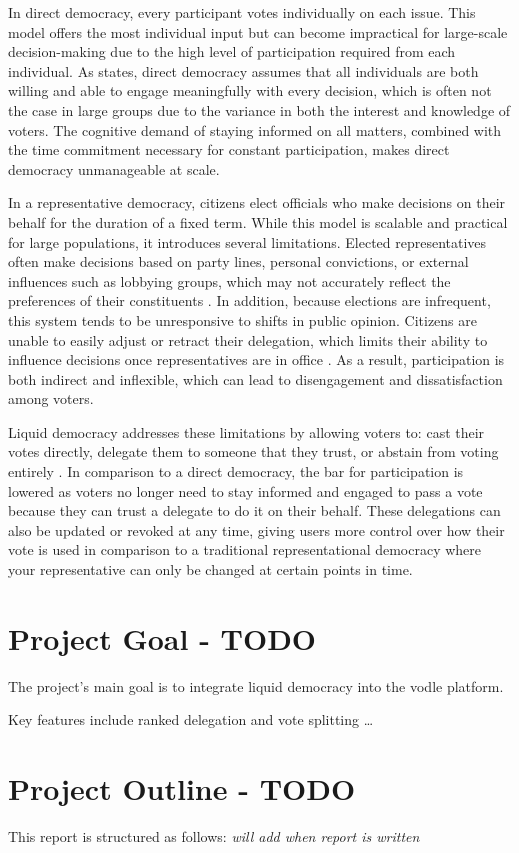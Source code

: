 In direct democracy, every participant votes individually on each issue. This model offers the most individual input but can become impractical for large-scale decision-making due to the high level of participation required from each individual. As \cite{ford_delegative_2002} states, direct democracy assumes that all individuals are both willing and able to engage meaningfully with every decision, which is often not the case in large groups due to the variance in both the interest and knowledge of voters. The cognitive demand of staying informed on all matters, combined with the time commitment necessary for constant participation, makes direct democracy unmanageable at scale.

In a representative democracy, citizens elect officials who make decisions on their behalf for the duration of a fixed term. While this model is scalable and practical for large populations, it introduces several limitations. Elected representatives often make decisions based on party lines, personal convictions, or external influences such as lobbying groups, which may not accurately reflect the preferences of their constituents \citep{blum_liquid_2016}. In addition, because elections are infrequent, this system tends to be unresponsive to shifts in public opinion. Citizens are unable to easily adjust or retract their delegation, which limits their ability to influence decisions once representatives are in office \citep{blum_liquid_2016}. As a result, participation is both indirect and inflexible, which can lead to disengagement and dissatisfaction among voters.

Liquid democracy addresses these limitations by allowing voters to: cast their votes directly, delegate them to someone that they trust, or abstain from voting entirely \citep{blum_liquid_2016}. In comparison to a direct democracy, the bar for participation is lowered as voters no longer need to stay informed and engaged to pass a vote because they can trust a delegate to do it on their behalf.
These delegations can also be updated or revoked at any time, giving users more control over how their vote is used in comparison to a traditional representational democracy where your representative can only be changed at certain points in time.

\section{Project Goal - TODO}
The project's main goal is to integrate liquid democracy into the vodle platform.

Key features include ranked delegation and vote splitting \dots

\section{Project Outline - TODO}
This report is structured as follows:
\textit{will add when report is written}